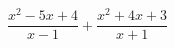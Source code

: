 \begin{ex}[type=expression]
	\begin{condition}
		\(\dfrac{x^2-5x+4}{x-1}+\dfrac{x^2+4x+3}{x+1}\)
	\end{condition}
\end{ex}